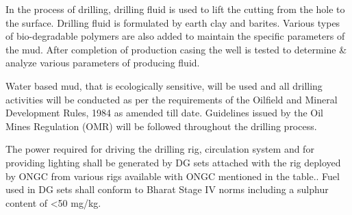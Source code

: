 In the process of drilling, drilling fluid is used to lift the cutting from the hole to the surface. Drilling fluid is formulated by earth clay and barites. Various types of bio-degradable polymers are also added to maintain the specific parameters of the mud. After completion of production casing the well is tested to determine \& analyze various parameters of producing fluid.

Water based mud, that is ecologically sensitive, will be used and all drilling activities will be conducted as per the requirements of the Oilfield and Mineral Development Rules, 1984 as amended till date. Guidelines issued by the Oil Mines Regulation (OMR) will be followed throughout the drilling process.

The power required for driving the drilling rig, circulation system and for providing lighting shall be generated by DG sets attached with the rig deployed by ONGC from various rigs available with ONGC mentioned in the table.. Fuel used in DG sets shall conform to Bharat Stage IV norms including a sulphur content of <50 mg/kg.


\newpage

